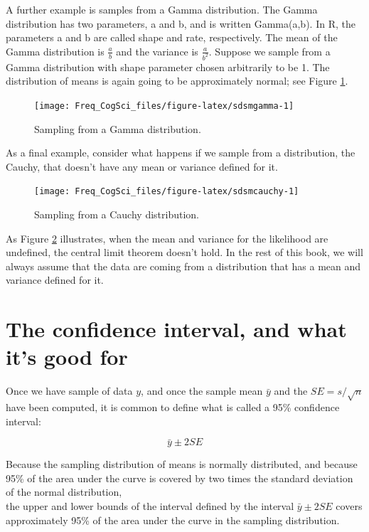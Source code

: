 \documentclass[
  12pt,
]{krantz}
\theoremstyle{definition}
\theoremstyle{definition}
\theoremstyle{definition}
\theoremstyle{definition}
\theoremstyle{remark}
\begin{document}
A further example is samples from a Gamma distribution. The Gamma distribution has two parameters, a and b, and is written Gamma(a,b).
In R, the parameters a and b are called shape and rate, respectively. The mean of the Gamma distribution is \(\frac{a}{b}\) and the variance is \(\frac{a}{b^2}\). Suppose we sample from a Gamma distribution with shape parameter chosen arbitrarily to be 1. The distribution of means is again going to be approximately normal; see Figure \ref{fig:sdsmgamma}.

\begin{figure}
\texttt{[image: Freq\_CogSci\_files/figure-latex/sdsmgamma-1]} \caption{Sampling from a Gamma distribution.}\label{fig:sdsmgamma}
\end{figure}

As a final example, consider what happens if we sample from a distribution, the Cauchy, that doesn't have any mean or variance defined for it.

\begin{figure}
\texttt{[image: Freq\_CogSci\_files/figure-latex/sdsmcauchy-1]} \caption{Sampling from a Cauchy distribution.}\label{fig:sdsmcauchy}
\end{figure}

As Figure \ref{fig:sdsmcauchy} illustrates, when the mean and variance for the likelihood are undefined, the central limit theorem doesn't hold. In the rest of this book, we will always assume that the data are coming from a distribution that has a mean and variance defined for it.

\hypertarget{the-confidence-interval-and-what-its-good-for}{%
\section{The confidence interval, and what it's good for}\label{the-confidence-interval-and-what-its-good-for}}

Once we have sample of data \(y\), and once the sample mean \(\bar{y}\) and the \(SE = s/\sqrt{n}\) have been computed, it is common to define what is called a 95\% confidence interval:

\begin{equation}
\bar{y} \pm 2 SE
\end{equation}

Because the sampling distribution of means is normally distributed, and because 95\% of the area under the curve is covered by two times the standard deviation of the normal distribution,\\
the upper and lower bounds of the interval defined by the interval \(\bar{y} \pm 2 SE\) covers approximately 95\% of the area under the curve in the sampling distribution.
\end{document}
